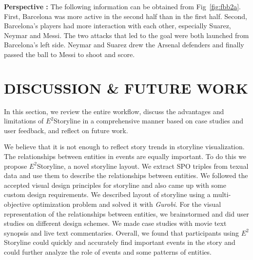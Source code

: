 \documentclass[review,journal]{vgtc}         %
\begin{document}
\textbf{Perspective :} The following information can be obtained from Fig~\ref{fig:fbb2a}. First, Barcelona was more active in the second half than in the first half. Second, Barcelona's players had more interaction with each other, especially Suarez, Neymar and Messi. The two attacks that led to the goal were both launched from Barcelona's left side. Neymar and Suarez drew the Arsenal defenders and finally passed the ball to Messi to shoot and score.


\section{DISCUSSION {\&} FUTURE WORK}
\noindent In this section, we review the entire workflow, discuss the advantages and limitations of $E^2$Storyline in a comprehensive manner based on case studies and user feedback, and reflect on future work.

We believe that it is not enough to reflect story trends in storyline visualization. The relationships between entities in events are equally important. To do this we propose $E^2$Storyline, a novel storyline layout. We extract SPO triples from texual data and use them to describe the relationships between entities. We followed the accepted visual design principles for storyline and also came up with some custom design requirements. We described layout of storyline using a multi-objective optimization problem and solved it with \textit{Gurobi}. For the visual representation of the relationships between entities, we brainstormed and did user studies on different design schemes. We made case studies with movie text synopsis and live text commentaries. Overall, we found that participants using $E^2$Storyline could quickly and accurately find important events in the story and could further analyze the role of events and some patterns of entities.
\end{document}

